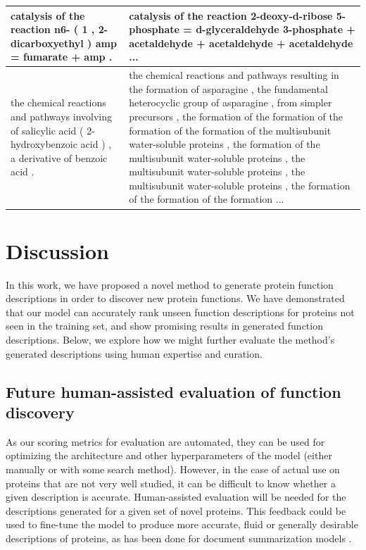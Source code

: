 \documentclass{specification}
\begin{document}
\begin{enumerate}
\begin{table}
\begin{tabular}{p{7.5 cm}|p{7.5 cm}}
        catalysis of the reaction n6- ( 1 , 2-dicarboxyethyl ) amp = fumarate + amp . & catalysis of the reaction 2-deoxy-d-ribose 5-phosphate = d-glyceraldehyde 3-phosphate + acetaldehyde + acetaldehyde + acetaldehyde ... \\ \hline
		the chemical reactions and pathways involving of salicylic acid ( 2-hydroxybenzoic acid ) , a derivative of benzoic acid . & the chemical reactions and pathways resulting in the formation of asparagine , the fundamental heterocyclic group of asparagine , from simpler precursors , the formation of the formation of the formation of the formation of the multisubunit water-soluble proteins , the formation of the multisubunit water-soluble proteins , the multisubunit water-soluble proteins , the multisubunit water-soluble proteins , the formation of the formation of the formation ... \\
		\bottomrule
	\end{tabular}
\end{table}

\end{enumerate}


\section{Discussion}
In this work, we have proposed a novel method to generate protein function descriptions in order to discover new protein functions.
We have demonstrated that our model can accurately rank unseen function descriptions for proteins not seen in the training set, and show promising results in generated function descriptions.
Below, we explore how we might further evaluate the method's generated descriptions using human expertise and curation.

\subsection{Future human-assisted evaluation of function discovery}
As our scoring metrics for evaluation are automated, they can be used for optimizing the architecture and other hyperparameters of the model (either manually or with some search method).
However, in the case of actual use on proteins that are not very well studied, it can be difficult to know whether a given description is accurate.
Human-assisted evaluation will be needed for the descriptions generated for a given set of novel proteins.
This feedback could be used to fine-tune the model to produce more accurate, fluid or generally desirable descriptions of proteins, as has been done for document summarization models \cite{finetuningWithHuman, learningToSummarize}.
\end{document}
